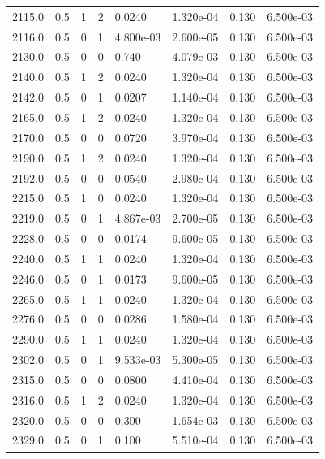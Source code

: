 \documentclass[preview]{standalone}
\begin{document}
{{{{{\begin{tabular}{L{1.2cm}C{1.2cm} C{0.3cm}C{0.5cm} C{1.4cm}C{1.4cm} C{1.4cm}C{1.4cm}}
  2115.0  &   0.5  & 1     &  2 &  0.0240  & 1.320e-04  & 0.130 &  6.500e-03   \\ 
  2116.0  &   0.5  & 0     &  1 &  4.800e-03  & 2.600e-05  & 0.130 &  6.500e-03   \\ 
  2130.0  &   0.5  & 0     &  0 &  0.740  & 4.079e-03  & 0.130 &  6.500e-03   \\ 
  2140.0  &   0.5  & 1     &  2 &  0.0240  & 1.320e-04  & 0.130 &  6.500e-03   \\ 
  2142.0  &   0.5  & 0     &  1 &  0.0207  & 1.140e-04  & 0.130 &  6.500e-03   \\ 
  2165.0  &   0.5  & 1     &  2 &  0.0240  & 1.320e-04  & 0.130 &  6.500e-03   \\ 
  2170.0  &   0.5  & 0     &  0 &  0.0720  & 3.970e-04  & 0.130 &  6.500e-03   \\ 
  2190.0  &   0.5  & 1     &  2 &  0.0240  & 1.320e-04  & 0.130 &  6.500e-03   \\ 
  2192.0  &   0.5  & 0     &  0 &  0.0540  & 2.980e-04  & 0.130 &  6.500e-03   \\ 
  2215.0  &   0.5  & 1     &  0 &  0.0240  & 1.320e-04  & 0.130 &  6.500e-03   \\ 
  2219.0  &   0.5  & 0     &  1 &  4.867e-03  & 2.700e-05  & 0.130 &  6.500e-03   \\ 
  2228.0  &   0.5  & 0     &  0 &  0.0174  & 9.600e-05  & 0.130 &  6.500e-03   \\ 
  2240.0  &   0.5  & 1     &  1 &  0.0240  & 1.320e-04  & 0.130 &  6.500e-03   \\ 
  2246.0  &   0.5  & 0     &  1 &  0.0173  & 9.600e-05  & 0.130 &  6.500e-03   \\ 
  2265.0  &   0.5  & 1     &  1 &  0.0240  & 1.320e-04  & 0.130 &  6.500e-03   \\ 
  2276.0  &   0.5  & 0     &  0 &  0.0286  & 1.580e-04  & 0.130 &  6.500e-03   \\ 
  2290.0  &   0.5  & 1     &  1 &  0.0240  & 1.320e-04  & 0.130 &  6.500e-03   \\ 
  2302.0  &   0.5  & 0     &  1 &  9.533e-03  & 5.300e-05  & 0.130 &  6.500e-03   \\ 
  2315.0  &   0.5  & 0     &  0 &  0.0800  & 4.410e-04  & 0.130 &  6.500e-03   \\ 
  2316.0  &   0.5  & 1     &  2 &  0.0240  & 1.320e-04  & 0.130 &  6.500e-03   \\ 
  2320.0  &   0.5  & 0     &  0 &  0.300  & 1.654e-03  & 0.130 &  6.500e-03   \\ 
  2329.0  &   0.5  & 0     &  1 &  0.100  & 5.510e-04  & 0.130 &  6.500e-03   \\ 

\end{tabular}}}}}}
\end{document}
